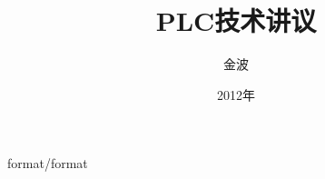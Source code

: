 \documentclass[12pt,twoside]{book}
\begin{document}
\begin{CJK}{UTF8}{song}
 {format/format}
\title{PLC技术讲议}
\author{金波}
\date{2012年}
\maketitle
\CJKtilde
\frontmatter
\tableofcontents
\mainmatter



\newpage
\end{CJK}
\end{document}
